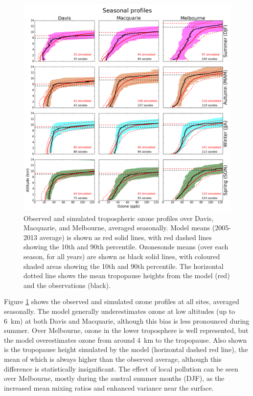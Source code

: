 \documentclass{article}
\begin{document}
  \begin{figure}[!htbp]
    \includegraphics[width=\textwidth]{figures/seasonalprofiles00.png}
    \caption{Observed and simulated tropospheric ozone profiles over Davis, Macquarie, and Melbourne, averaged seasonally.
    Model means (2005-2013 average) is shown as red solid lines, with red dashed lines showing the 10th and 90th percentile.
    Ozonesonde means (over each season, for all years) are shown as black solid lines, with coloured shaded areas showing the 10th and 90th percentile.
    The horizontal dotted line shows the mean tropopause heights from the model (red) and the observations (black).}
    \label{fig:GEOSChemSeasonalProfiles}
  \end{figure}
  
  Figure \ref{fig:GEOSChemSeasonalProfiles} shows the observed and simulated ozone profiles at all sites, averaged seasonally.
  The model generally underestimates ozone at low altitudes (up to 6~km) at both Davis and Macquarie, although this bias is less pronounced during summer.
  Over Melbourne, ozone in the lower troposphere is well represented, but the model overestimates ozone from around 4~km to the tropopause.
  Also shown is the tropopause height simulated by the model (horizontal dashed red line), the mean of which is always higher than the observed average, although this difference is statistically insignificant.
  The effect of local pollution can be seen over Melbourne, mostly during the austral summer months (DJF), as the increased mean mixing ratios and enhanced variance near the surface.
  
\end{document}
